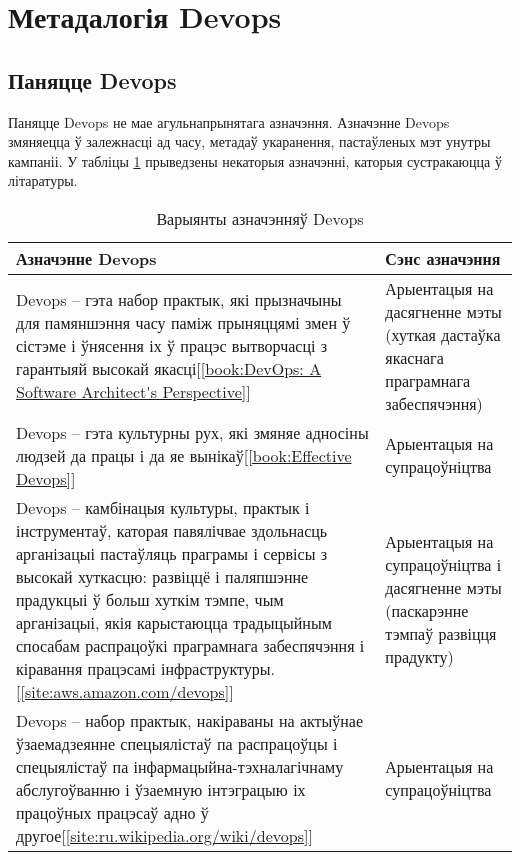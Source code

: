 \section{Метадалогія Devops}

\subsection{Паняцце Devops}

Паняцце Devops не мае агульнапрынятага азначэння.
Азначэнне Devops змяняецца ў залежнасці ад часу, метадаў укаранення,
пастаўленых мэт унутры кампаніі.
У табліцы \ref{table:Definition of Devops} прыведзены некаторыя
азначэнні, каторыя сустракаюцца ў літаратуры.

\begin{table}[htbp]
    \caption{Варыянты азначэнняў Devops}
    \begin{tabular}{|p{}|p{}|} 
        \hline
        \textbf{Азначэнне Devops}
        &
        \textbf{Сэнс азначэння}  \\ 
        \hline
        Devops -- гэта набор практык, які прызначыны для
        памяншэння часу паміж прыняццямі змен ў сістэме і
        ўнясення іх ў працэс вытворчасці з гарантыяй
        высокай якасці[\ref{book:DevOps: A Software Architect's Perspective}]
        &
        Арыентацыя на дасягненне мэты (хуткая дастаўка
        якаснага праграмнага забеспячэння) \\ 
        \hline
        Devops -- гэта культурны рух, які змяняе адносіны людзей
        да працы і да яе вынікаў[\ref{book:Effective Devops}]
        & Арыентацыя на супрацоўніцтва \\ 
        \hline
        Devops -- камбінацыя культуры, практык і інструментаў,
        каторая павялічвае здольнасць арганізацыі
        пастаўляць праграмы і сервісы
        з высокай хуткасцю: развіццё і паляпшэнне прадукцыі
        ў больш хуткім тэмпе,
        чым арганізацыі, якія карыстаюцца традыцыйным спосабам распрацоўкі
        праграмнага забеспячэння і
        кіравання працэсамі інфраструктуры.[\ref{site:aws.amazon.com/devops}]
        & Арыентацыя на супрацоўніцтва і дасягненне мэты
        (паскарэнне тэм\-паў развіцця прадукту) \\
        \hline
        Devops -- набор практык, накіраваны на актыўнае ўзаемадзеянне
        спецыялістаў па распрацоўцы і
        спецыялістаў па інфармацыйна-тэхналагічнаму
        абслугоўванню і ўзаемную інтэграцыю
        іх працоўных працэсаў
        адно ў другое[\ref{site:ru.wikipedia.org/wiki/devops}]
        &
        Арыентацыя на супрацоўніцтва \\
        \hline
    \end{tabular}
    \label{table:Definition of Devops}
\end{table}

